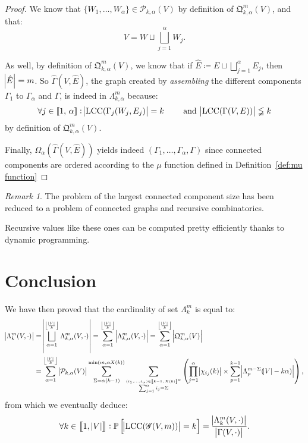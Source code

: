 \documentclass{article}
\theoremstyle{definition}
\theoremstyle{remark}
\newtheorem*{remark}{Remark}
\DeclareMathOperator{\LCC}{LCC}
\renewcommand{\P}{\mathbb P}
\newcommand{\intint}[2]{\left\llbracket#1, \, #2\right\rrbracket}
\newcommand{\floor}[1]{\left\lfloor#1\right\rfloor}
\begin{document}
\begin{proof}
		We know that $\{W_1, \ldots, W_\alpha\} \in \mathcal P_{k,\alpha}(V)$ by definition of $\mathfrak Q_{k,\alpha}^m(V)$, and that:
		\[V = W \sqcup \bigsqcup_{j=1}^\alpha W_j.\]

		As well, by definition of $\mathfrak Q_{k,\alpha}^m(V)$, we know that if $\hat E \coloneqq E \sqcup \bigsqcup_{j=1}^\alpha E_j$, then $\abs {\hat E} = m$.
		So $\hat \Gamma(V, \hat E)$, the graph created by \textit{assembling} the different components $\Gamma_1$ to $\Gamma_\alpha$ and $\Gamma$, is indeed in
		$\Lambda_{k,\alpha}^m$ because:
		\[\forall j \in \intint 1\alpha : \abs {\LCC(\Gamma_j(W_j, E_j)} = k\qquad \text{ and } \abs {\LCC(\Gamma(V, E))} \lneqq k\]
		by definition of $\mathfrak Q_{k,\alpha}^m(V)$.

		Finally, $\Omega_\alpha(\hat \Gamma(V, \hat E))$ yields indeed $(\Gamma_1, \ldots, \Gamma_\alpha, \Gamma)$ since connected components are ordered according
		to the $\mu$ function defined in Definition~\ref{def:mu function}
		\end{proof}

		\begin{remark} The problem of the largest connected component size has been reduced to a problem of connected graphs and recursive combinatorics.

		Recursive values like these ones can be computed pretty efficiently thanks to dynamic programming.
		\end{remark}

\section{Conclusion}
	We have then proved that the cardinality of set $\Lambda_k^m$ is equal to:
	\begin{align*}
		\abs {\Lambda_k^m(V, \cdot)} &= \abs {\bigsqcup_{\alpha=1}^{\floor {\frac {\abs V}k}}\Lambda_{k,\alpha}^m(V, \cdot)}
			= \sum_{\alpha=1}^{\floor {\frac {\abs V}k}}\abs {\Lambda_{k,\alpha}^m(V, \cdot)} = \sum_{\alpha=1}^{\floor {\frac {\abs V}k}}\abs {\mathfrak Q_{k,\alpha}^m(V)} \\
		&= \sum_{\alpha=1}^{\floor {\frac {\abs V}k}}\abs {\mathcal P_{k,\alpha}(V)}\sum_{\Sigma=\alpha(k-1)}^{\min(m, \alpha X(k))}
			\sum_{\stackrel {(i_1, \ldots, i_\alpha) \in \intint {k-1}{X(k)}^\alpha}{\sum_{j=1}^\alpha i_j = \Sigma}}
			\left(\prod_{j=1}^\alpha\abs {\chi_{i_j}(k)} \times \sum_{p=1}^{k-1}\abs {\Lambda_p^{m-\Sigma}(\abs V-k\alpha)}\right),
	\end{align*}
	from which we eventually deduce:
	\[\forall k \in \intint 1{\abs V} : \P\left[\abs {\LCC(\mathscr G(V, m))} = k\right] = \frac {\abs {\Lambda_k^m(V, \cdot)}}{\abs {\Gamma(V, \cdot)}}.\]
\end{document}
